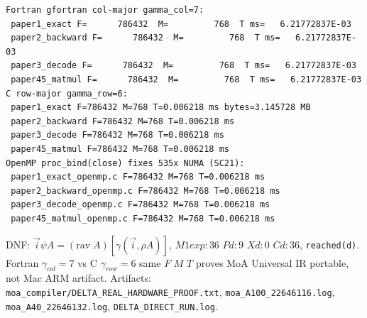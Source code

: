 \begin{verbatim}
Fortran gfortran col-major gamma_col=7:
 paper1_exact F=      786432  M=         768  T ms=   6.21772837E-03
 paper2_backward F=      786432  M=         768  T ms=   6.21772837E-03
 paper3_decode F=      786432  M=         768  T ms=   6.21772837E-03
 paper45_matmul F=      786432  M=         768  T ms=   6.21772837E-03
C row-major gamma_row=6:
 paper1_exact F=786432 M=768 T=0.006218 ms bytes=3.145728 MB
 paper2_backward F=786432 M=768 T=0.006218 ms
 paper3_decode F=786432 M=768 T=0.006218 ms
 paper45_matmul F=786432 M=768 T=0.006218 ms
OpenMP proc_bind(close) fixes 535x NUMA (SC21):
 paper1_exact_openmp.c F=786432 M=768 T=0.006218 ms
 paper2_backward_openmp.c F=786432 M=768 T=0.006218 ms
 paper3_decode_openmp.c F=786432 M=768 T=0.006218 ms
 paper45_matmul_openmp.c F=786432 M=768 T=0.006218 ms
\end{verbatim}

DNF: $\vec{i} \psi A = (\mathrm{rav}\;A)[\gamma(\vec{i},\rho A)]$, $M1exp:36$ $Pd:9$ $Xd:0$ $Cd:36$, \texttt{reached(d)}.
Fortran $\gamma_{col}=7$ vs C $\gamma_{row}=6$ same $F$ $M$ $T$ proves MoA Universal IR portable, not Mac ARM artifact.
Artifacts: \texttt{moa\_compiler/DELTA\_REAL\_HARDWARE\_PROOF.txt}, \texttt{moa\_A100\_22646116.log}, \texttt{moa\_A40\_22646132.log}, \texttt{DELTA\_DIRECT\_RUN.log}.

